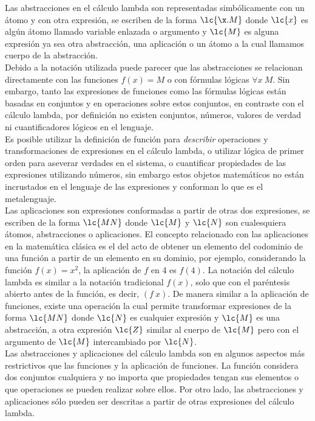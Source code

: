 Las abstracciones en el cálculo lambda son representadas simbólicamente con un
átomo y con otra expresión, se escriben de la forma \(\lc{\x.M}\) donde
\(\lc{x}\) es algún átomo llamado variable enlazada o argumento y \(\lc{M}\)
es alguna expresión ya sea otra abstracción, una aplicación o un átomo a la cual
llamamos cuerpo de la abstracción. \\

Debido a la notación utilizada puede parecer que las abstracciones se relacionan
directamente con las funciones \(f(x)=M\) o con fórmulas lógicas \(\forall x\
M\). Sin embargo, tanto las expresiones de funciones como las fórmulas lógicas
están basadas en conjuntos y en operaciones sobre estos conjuntos, en contraste
con el cálculo lambda, por definición no existen conjuntos, números, valores de
verdad ni cuantificadores lógicos en el lenguaje. \\

Es posible utilizar la definición de función para \emph{describir} operaciones y
transformaciones de expresiones en el cálculo lambda, o utilizar lógica de
primer orden para aseverar verdades en el sistema, o cuantificar propiedades de
las expresiones utilizando números, sin embargo estos objetos matemáticos  no
están incrustados en el lenguaje de las expresiones y conforman lo que es el
metalenguaje. \\

Las aplicaciones son expresiones conformadas a partir de otras dos expresiones,
se escriben de la forma \(\lc{M N}\) donde \(\lc{M}\) y \(\lc{N}\) son
cualesquiera átomos, abstracciones o aplicaciones. El concepto relacionado con
las aplicaciones en la matemática clásica es el del acto de obtener un elemento
del codominio de una función a partir de un elemento en su dominio, por ejemplo,
considerando la función \(f(x)=x^{2}\), la aplicación de \(f\) en 4 es \(f(4)\).
La notación del cálculo lambda es similar a la notación tradicional \(f(x)\),
solo que con el paréntesis abierto antes de la función, es decir, \((f\ x)\). De
manera similar a la aplicación de funciones, existe una operación la cual
permite transformar expresiones de la forma \(\lc{M N}\) donde \(\lc{N}\) es
cualquier expresión y \(\lc{M}\) es una abstracción, a otra expresión \(\lc{Z}\)
similar al cuerpo de \(\lc{M}\) pero con el argumento de \(\lc{M}\)
intercambiado por \(\lc{N}\). \\

Las abstracciones y aplicaciones del cálculo lambda son en algunos aspectos más
restrictivos que las funciones y la aplicación de funciones. La función
considera dos conjuntos cualquiera y no importa que propiedades tengan sus
elementos o que operaciones se pueden realizar sobre ellos. Por otro lado, las
abstracciones y aplicaciones sólo pueden ser descritas a partir de otras
expresiones del cálculo lambda. \\

